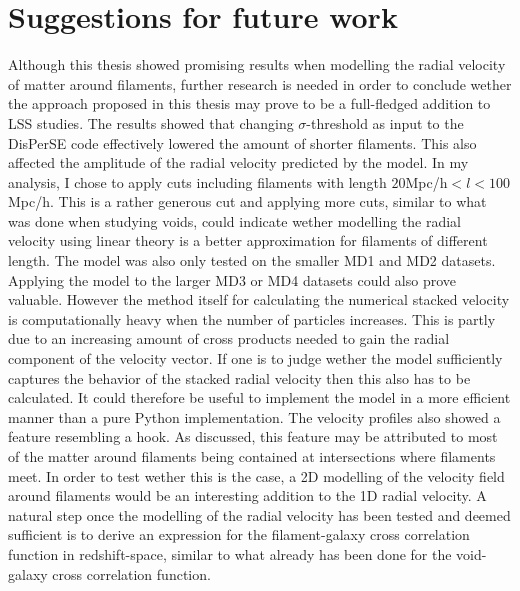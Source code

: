 \section{Suggestions for future work}\label{sec:futurework}
Although this thesis showed promising results when modelling the radial velocity of matter around filaments, further research is needed in order to conclude wether the approach proposed in this thesis may prove to be a full-fledged addition to LSS studies. The results showed that changing $\sigma$-threshold as input to the DisPerSE code effectively lowered the amount of shorter filaments. This also affected the amplitude of the radial velocity predicted by the model. In my analysis, I chose to apply cuts including filaments with length $20$Mpc/h$<l<100$Mpc/h. This is a rather generous cut and applying more cuts, similar to what was done when studying voids, could indicate wether modelling the radial velocity using linear theory is a better approximation for filaments of different length. The model was also only tested on the smaller MD1 and MD2 datasets. Applying the model to the larger MD3 or MD4 datasets could also prove valuable. However the method itself for calculating the numerical stacked velocity is computationally heavy when the number of particles increases. This is partly due to an increasing amount of cross products needed to gain the radial component of the velocity vector. If one is to judge wether the model sufficiently captures the behavior of the stacked radial velocity then this also has to be calculated. It could therefore be useful to implement the model in a more efficient manner than a pure Python implementation. The velocity profiles also showed a feature resembling a hook. As discussed, this feature may be attributed to most of the matter around filaments being contained at intersections where filaments meet. In order to test wether this is the case, a 2D modelling of the velocity field around filaments would be an interesting addition to the 1D radial velocity. A natural step once the modelling of the radial velocity has been tested and deemed sufficient is to derive an expression for the filament-galaxy cross correlation function in redshift-space, similar to what already has been done for the void-galaxy cross correlation function.\\\indent
